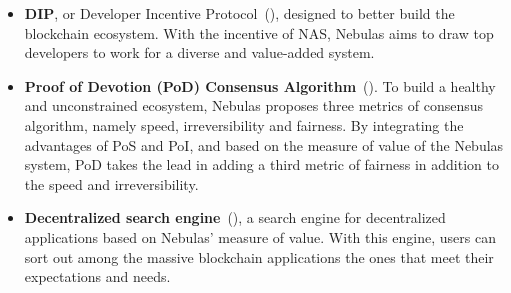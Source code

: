 {\begin{itemize}
	\item \textbf{DIP}, or Developer Incentive Protocol~(), designed to better build the blockchain ecosystem. With the incentive of NAS, Nebulas aims to draw top developers to work for a diverse and value-added system.

  \item \textbf{Proof of Devotion (PoD) Consensus Algorithm}~(). To build a healthy and unconstrained ecosystem, Nebulas proposes three metrics of consensus algorithm, namely speed, irreversibility and fairness. By integrating the advantages of PoS and PoI, and based on the measure of value of the Nebulas system, PoD takes the lead in adding a third metric of fairness in addition to the speed and irreversibility.

  \item \textbf{Decentralized search engine}~(), a search engine for decentralized applications based on Nebulas’ measure of value. With this engine, users can sort out among the massive blockchain applications the ones that meet their expectations and needs.

\end{itemize}
}
